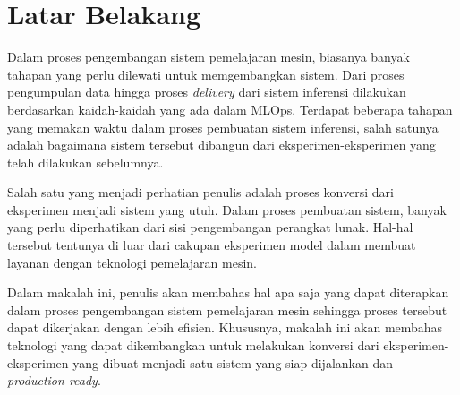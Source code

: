 \section{Latar Belakang}

Dalam proses pengembangan sistem pemelajaran mesin, biasanya banyak tahapan yang perlu dilewati untuk memgembangkan sistem.
Dari proses pengumpulan data hingga proses \textit{delivery} dari sistem inferensi dilakukan berdasarkan kaidah-kaidah yang ada dalam MLOps.
Terdapat beberapa tahapan yang memakan waktu dalam proses pembuatan sistem inferensi, salah satunya adalah bagaimana sistem tersebut dibangun dari eksperimen-eksperimen yang telah dilakukan sebelumnya.

Salah satu yang menjadi perhatian penulis adalah proses konversi dari eksperimen menjadi sistem yang utuh.
Dalam proses pembuatan sistem, banyak yang perlu diperhatikan dari sisi pengembangan perangkat lunak.
Hal-hal tersebut tentunya di luar dari cakupan eksperimen model dalam membuat layanan dengan teknologi pemelajaran mesin.

Dalam makalah ini, penulis akan membahas hal apa saja yang dapat diterapkan dalam proses pengembangan sistem pemelajaran mesin sehingga proses tersebut dapat dikerjakan dengan lebih efisien.
Khususnya, makalah ini akan membahas teknologi yang dapat dikembangkan untuk melakukan konversi dari eksperimen-eksperimen yang dibuat menjadi satu sistem yang siap dijalankan dan \textit{production-ready}.